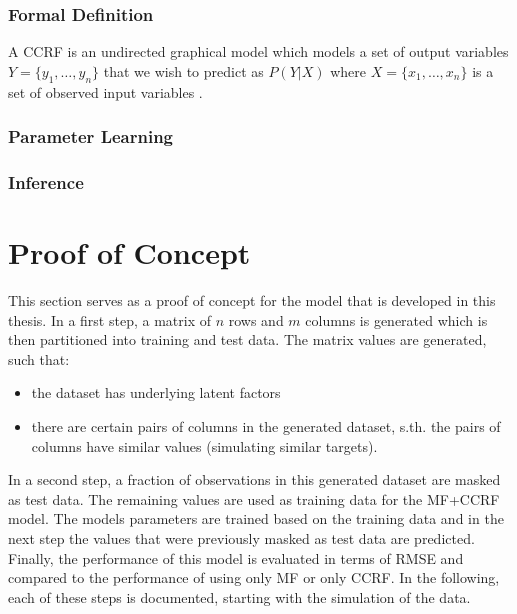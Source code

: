 

\subsubsection{Formal Definition}
A CCRF is an undirected graphical model which models a set of output variables $Y=\{y_1,\dots,y_n\}$ that we wish to predict as $P(Y|X)$ where  $X=\{x_1,\dots,x_n\}$ is a set of observed input variables .
\subsubsection{Parameter Learning}
\subsubsection{Inference}

\section{Proof of Concept}
This section serves as a proof of concept for the model that is developed in this thesis. In a first step, a matrix of $n$ rows and $m$ columns is generated which is then partitioned into training and test data. The matrix values are generated, such that:

\begin{itemize}
\item the dataset has underlying latent factors
\item there are certain pairs of columns in the generated dataset, s.th. the pairs of columns have similar values (simulating similar targets).
\end{itemize}

In a second step, a fraction of observations in this generated dataset are masked as test data. The remaining values are used as training data for the MF+CCRF model. The models parameters are trained based on the training data and in the next step the values that were previously masked as test data are predicted. Finally, the performance of this model is evaluated in terms of RMSE and compared to the performance of using only MF or only CCRF.
In the following, each of these steps is documented, starting with the simulation of the data.

